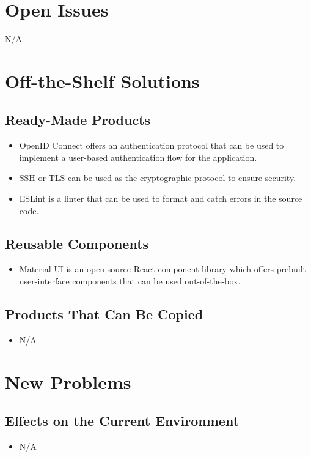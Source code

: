 \documentclass[12pt]{article}
\begin{document}
\section{Open Issues}
N/A

\section{Off-the-Shelf Solutions}
\subsection{Ready-Made Products}
\begin{itemize}
    \item OpenID Connect offers an authentication protocol that can be used to implement a user-based authentication flow for the application.
    \item SSH or TLS can be used as the cryptographic protocol to ensure security.
    \item ESLint is a linter that can be used to format and catch errors in the source code.
\end{itemize}

\subsection{Reusable Components}
\begin{itemize}
    \item Material UI is an open-source React component library which offers prebuilt user-interface components that can be used out-of-the-box.
\end{itemize}
\subsection{Products That Can Be Copied}
\begin{itemize}
    \item N/A
\end{itemize}

\section{New Problems}
\subsection{Effects on the Current Environment}
\begin{itemize}
    \item N/A
\end{itemize}
\end{document}
